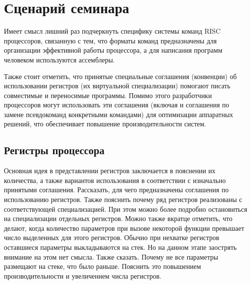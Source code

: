 \section{Сценарий семинара}


Имеет смысл лишний раз подчеркнуть специфику системы команд RISC процессоров, связанную с тем, что форматы команд предназначены для организации эффективной работы процессора, а для написания программ человеком используются ассемблеры.

Также стоит отметить, что принятые специальные соглашения (конвенции) об использовании регистров (их виртуальной специализации) помогают писать совместимые и переносимые программы. Помимо этого разработчики процессоров могут использовать эти соглашения (включая и соглашения по замене псевдокоманд конкретными командами) для оптимизации аппаратных решений, что обеспечивает повышение производительности систем.

\subsection{Регистры процессора}

Основная идея в представлении регистров заключается в пояснении их количества, а также вариантов использования в соответствии с изначально принятыми соглашения. Рассказать, для чего предназначены соглашения по использованию регистров. Также пояснить почему ряд регистров реализованы с соответствующей специализацией. При этом можно более подробно остановиться на специализации отдельных регистров. Можно также вкратце отметить, что делают, когда количество параметров при вызове некоторой функции превышает число выделенных для этого регистров. Обычно при нехватке регистров оставшиеся параметры выкладываются на стек. Но на данном этапе заострять внимание на этом нет смысла. Также сказать. Почему не все параметры размещают на стеке, что было раньше. Пояснить это повышением производительности и увеличением числа регистров.

